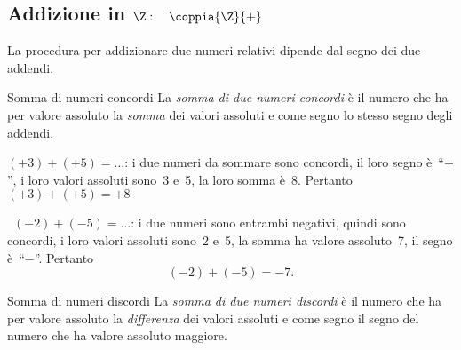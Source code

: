\subsection{Addizione in 
\texorpdfstring{$\Z: \quad \coppia{\Z}{+}$}{Z: (Z; +)}}
\indc{\(\Z\)}{\(\coppia{\Z}{+}\)}


La procedura per addizionare due numeri relativi dipende dal segno dei due 
addendi.

\begin{definizione}{Somma di numeri concordi}{}
La \emph{somma di due numeri concordi} è il numero che 
ha per valore assoluto la \emph{somma} dei valori 
assoluti e come segno lo stesso segno degli addendi.
\end{definizione}

\begin{esempio}{}{}
\( (+3)+(+5)=\ldots\): i due numeri da sommare sono concordi, 
il loro segno è~``\(+\)'', i loro valori assoluti sono~3 e~5,
la loro somma è~8. Pertanto~\((+3)+(+5)=+8\)
\end{esempio}

\begin{esempio}{}{}
~\((-2)+(-5)=\ldots\): i due numeri sono entrambi negativi, quindi sono 
concordi, 
i loro valori assoluti sono~2 e~5,
la somma ha valore assoluto~7, il segno è~``\(-\)''. Pertanto
\[(-2)+(-5)=-7.\]
\end{esempio}

\begin{definizione}{Somma di numeri discordi}{}
La \emph{somma di due numeri discordi} è il numero che ha 
per valore assoluto la \emph{differenza} dei valori assoluti
e come segno il segno del numero che ha valore assoluto maggiore.
\end{definizione}

